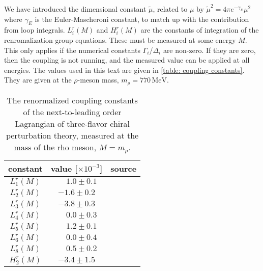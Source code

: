 %
We have introduced the dimensional constant $\tilde \mu$, related to $\mu$ by $\tilde \mu^2 = 4 \pi e^{-\gamma_E} \mu^2$ where $\gamma_E$ is the Euler-Mascheroni constant, to match up with the contribution from loop integrals.
$L_i^r(M)$ and $H_i^r(M)$ are the constants of integration of the renromalization group equations.
These must be measured at some energy $M$.
This only applies if the numerical constants $\Gamma_i$/$\Delta_i$ are non-zero.
If they are zero, then the coupling is not running, and the measured value can be applied at all energies.
The values used in this text are given in \autoref{table: coupling constants}.
They are given at the $\rho$-meson mass, $m_\rho = 770\, \text{MeV}$.
%
\begin{table}
    \centering
    \def\arraystretch{1.2}
    \caption{The renormalized coupling constants of the next-to-leading order Lagrangian of three-flavor chiral perturbation theory, measured at the mass of the rho meson, $M = m_\rho$.}
    \label{table: coupling constants}
    \begin{tabular}{c c c}
        \hline \hline
        constant & value [$\times 10^{-3}$] & source \\
        \hline
        $L_1^r(M)$ & $\phantom{-}1.0 \pm 0.1 $ & \autocite{bijnensMesonicLowEnergyConstants2014} \\
        $L_2^r(M)$ & $-1.6 \pm 0.2 $ & \autocite{bijnensMesonicLowEnergyConstants2014} \\
        $L_3^r(M)$ & $-3.8 \pm 0.3 $ & \autocite{bijnensMesonicLowEnergyConstants2014} \\
        $L_4^r(M)$ & $\phantom{-}0.0 \pm 0.3 $ & \autocite{bijnensMesonicLowEnergyConstants2014} \\
        $L_5^r(M)$ & $\phantom{-}1.2 \pm 0.1 $ & \autocite{bijnensMesonicLowEnergyConstants2014} \\
        $L_6^r(M)$ & $\phantom{-}0.0 \pm 0.4 $ & \autocite{bijnensMesonicLowEnergyConstants2014} \\
        $L_8^r(M)$ & $\phantom{-}0.5 \pm 0.2 $ & \autocite{bijnensMesonicLowEnergyConstants2014} \\
        $H_2^r(M)$ & $-3.4 \pm 1.5 $ & \autocite{jaminFlavoursymmetryBreakingQuark2002}  \\
        \hline
    \end{tabular}
\end{table}

